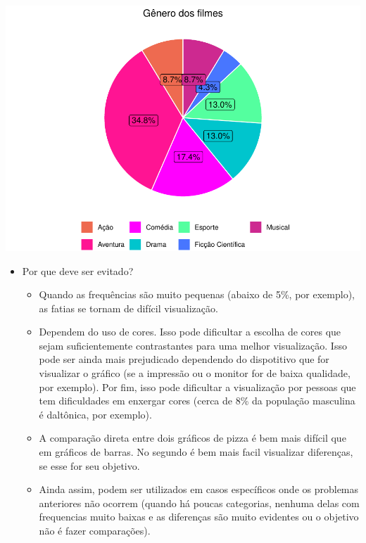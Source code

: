 \documentclass[
]{book}
\providecommand{\tightlist}{%
  \setlength{\itemsep}{0pt}\setlength{\parskip}{0pt}}
\begin{document}
\begin{center}\includegraphics{AED_files/figure-latex/pizza1-1} \end{center}

\begin{itemize}
\tightlist
\item
  Por que deve ser evitado?

  \begin{itemize}
  \tightlist
  \item
    Quando as frequências são muito pequenas (abaixo de 5\%, por exemplo), as fatias se tornam de difícil visualização.\\
  \item
    Dependem do uso de cores. Isso pode dificultar a escolha de cores que sejam suficientemente contrastantes para uma melhor visualização. Isso pode ser ainda mais prejudicado dependendo do dispotitivo que for visualizar o gráfico (se a impressão ou o monitor for de baixa qualidade, por exemplo). Por fim, isso pode dificultar a visualização por pessoas que tem dificuldades em enxergar cores (cerca de 8\% da população masculina é daltônica, por exemplo).\\
  \item
    A comparação direta entre dois gráficos de pizza é bem mais difícil que em gráficos de barras. No segundo é bem mais facil visualizar diferenças, se esse for seu objetivo.\\
  \item
    Ainda assim, podem ser utilizados em casos específicos onde os problemas anteriores não ocorrem (quando há poucas categorias, nenhuma delas com frequencias muito baixas e as diferenças são muito evidentes ou o objetivo não é fazer comparações).
  \end{itemize}
\end{itemize}
\end{document}
